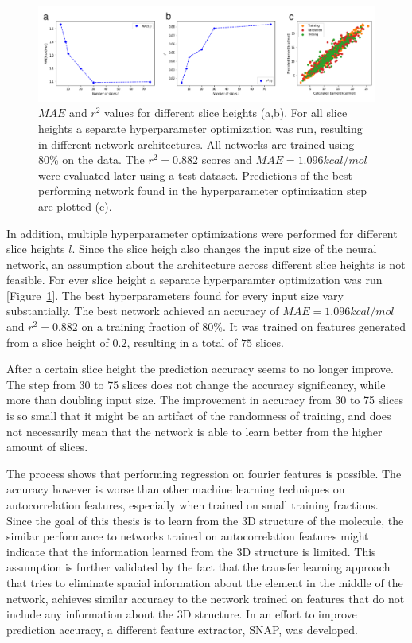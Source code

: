 \begin{figure}[H]
    \includegraphics[width=1.0\textwidth]{figures/regression/fourier/slice-exp.png}
    \caption[Evaluation of LEFD models]{
      $MAE$ and $r^2$ values for different slice heights (a,b).
      For all slice heights a separate hyperparameter optimization was run, resulting in different network architectures.
      All networks are trained using 80\% on the data. The $r^2=0.882$ scores and $MAE=1.096 kcal/mol$ were evaluated later using a test dataset.
      Predictions of the best performing network found in the hyperparameter optimization step are plotted (c).
    }
    \label{fig:fourier_final}
\end{figure}


In addition, multiple hyperparameter optimizations were performed for different slice heights $l$.
Since the slice heigh also changes the input size of the neural network, an assumption about the 
architecture across different slice heights is not feasible.
For ever slice height a separate hyperparamter optimization was run [Figure~\ref{fig:fourier_final}].
The best hyperparameters found for every input size vary substantially.
The best network achieved an accuracy of $MAE=1.096 kcal/mol$ and $r^2=0.882$ on a training fraction of 80\%.
It was trained on features generated from a slice height of $0.2$, resulting in a total of $75$ slices.

After a certain slice height the prediction accuracy seems to no longer improve.
The step from 30 to 75 slices does not change the accuracy significancy, while more than doubling input size.
The improvement in accuracy from 30 to 75 slices is so small that it might be an artifact of the 
randomness of training, and does not necessarily mean that the network is able to learn better from the higher amount of slices.



The process shows that performing regression on fourier features is possible.
The accuracy however is worse than other machine learning techniques on autocorrelation features, especially when trained on small training fractions.
Since the goal of this thesis is to learn from the 3D structure of the molecule, the similar performance to networks trained on autocorrelation features
might indicate that the information learned from the 3D structure is limited.
This assumption is further validated by the fact that the transfer learning approach that 
tries to eliminate spacial information about the element in the middle of the network, achieves similar accuracy to the 
network trained on features that do not include any information about the 3D structure.
In an effort to improve prediction accuracy, a different feature extractor, SNAP, was developed.








